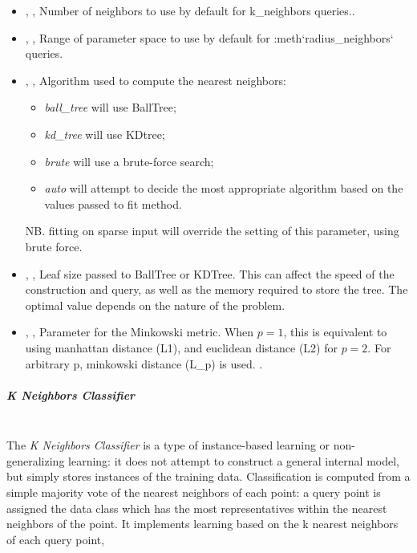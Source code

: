 \begin{itemize}
  \item {} , ,
  Number of neighbors to use by default for k\_neighbors queries..
  \item {} , ,
  Range of parameter space to use by default for :meth`radius\_neighbors`
  queries.
  \item {} , ,
  Algorithm used to compute the nearest neighbors:
\begin{itemize}
    \item \textit{ball\_tree} will use BallTree;
    \item \textit{kd\_tree} will use KDtree;
    \item \textit{brute} will use a brute-force search;
    \item \textit{auto} will attempt to decide the most appropriate algorithm
    based on the values passed to fit method.
\end{itemize}
  NB.
  fitting on sparse input will override the setting of this parameter, using
  brute force.
  \item {} , ,
  Leaf size passed to BallTree or KDTree.
  This can affect the speed of the construction and query, as well as the memory
  required to store the tree.
  The optimal value depends on the nature of the problem.
  \item {} , ,
  Parameter for the Minkowski metric.
  When $p = 1$, this is equivalent to using manhattan distance (L1), and
  euclidean distance (L2) for $p = 2$.
  For arbitrary p, minkowski distance (L\_p) is used.
  .
\end{itemize}
\subparagraph{K Neighbors Classifier }
\mbox{}
\\The \textit{K Neighbors Classifier} is a type of instance-based learning or
non-generalizing learning: it does not attempt to construct a general internal
model, but simply stores instances of the training data.
%
Classification is computed from a simple majority vote of the nearest neighbors
of each point: a query point is assigned the data class which has the most
representatives within the nearest neighbors of the point.
%
It implements learning based on the k nearest neighbors of each query point,

